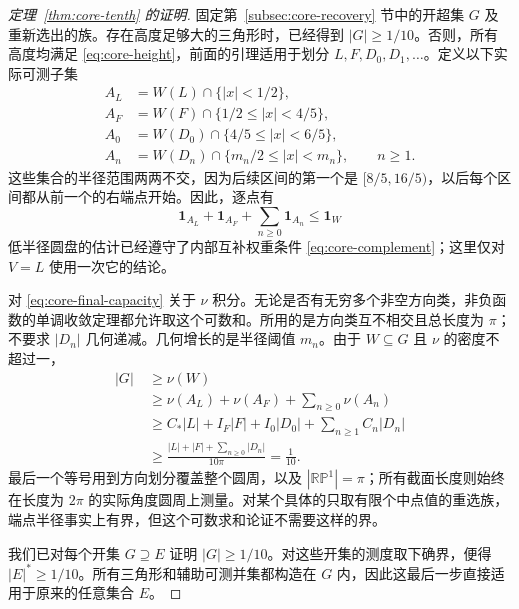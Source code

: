 \begin{proof}[定理~\ref{thm:core-tenth} 的证明]
固定第~\ref{subsec:core-recovery} 节中的开超集 $G$ 及重新选出的族。存在高度足够大的三角形时，已经得到 $|G|\geq1/10$。否则，所有高度均满足 \eqref{eq:core-height}，前面的引理适用于划分 $L,F,D_0,D_1,\ldots$。定义以下实际可测子集
\begin{align*}
 A_L&=W(L)\cap\{|x|<1/2\},\\
 A_F&=W(F)\cap\{1/2\leq|x|<4/5\},\\
 A_0&=W(D_0)\cap\{4/5\leq|x|<6/5\},\\
 A_n&=W(D_n)\cap\{m_n/2\leq|x|<m_n\},\qquad n\geq1.
\end{align*}
这些集合的半径范围两两不交，因为后续区间的第一个是 $[8/5,16/5)$，以后每个区间都从前一个的右端点开始。因此，逐点有
\begin{equation}
       \mathbf1_{A_L}+\mathbf1_{A_F}+\sum_{n\geq0}\mathbf1_{A_n}
                                                   \leq\mathbf1_W
\label{eq:core-final-capacity}
\end{equation}
低半径圆盘的估计已经遵守了内部互补权重条件 \eqref{eq:core-complement}；这里仅对 $V=L$ 使用一次它的结论。

对 \eqref{eq:core-final-capacity} 关于 $\nu$ 积分。无论是否有无穷多个非空方向类，非负函数的单调收敛定理都允许取这个可数和。所用的是方向类互不相交且总长度为 $\pi$；不要求 $|D_n|$ 几何递减。几何增长的是半径阈值 $m_n$。由于 $W\subseteq G$ 且 $\nu$ 的密度不超过一，
\begin{align*}
 |G|\ &\geq\nu(W)\\
 &\geq\nu(A_L)+\nu(A_F)+\sum_{n\geq0}\nu(A_n)\\
 &\geq C_*|L|+I_F|F|+I_0|D_0|+\sum_{n\geq1}C_n|D_n|\\
 &\geq\frac{|L|+|F|+\sum_{n\geq0}|D_n|}{10\pi}
       =\frac1{10}.
\end{align*}
最后一个等号用到方向划分覆盖整个圆周，以及 $|\mathbb {RP}^1|=\pi$；所有截面长度则始终在长度为 $2\pi$ 的实际角度圆周上测量。对某个具体的只取有限个中点值的重选族，端点半径事实上有界，但这个可数求和论证不需要这样的界。

我们已对每个开集 $G\supseteq E$ 证明 $|G|\geq1/10$。对这些开集的测度取下确界，便得 $|E|^*\geq1/10$。所有三角形和辅助可测并集都构造在 $G$ 内，因此这最后一步直接适用于原来的任意集合 $E$。
\end{proof}
